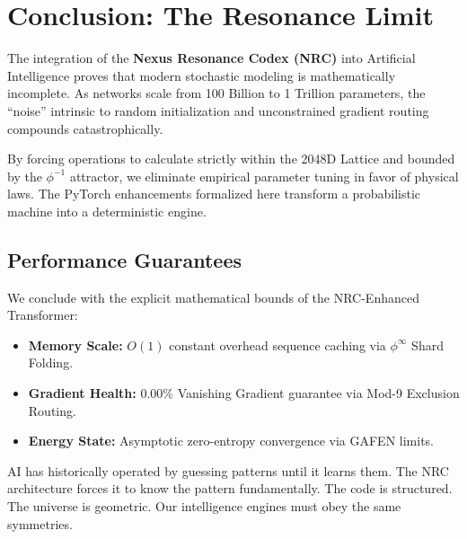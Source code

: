 \section{Conclusion: The Resonance Limit}

The integration of the \textbf{Nexus Resonance Codex (NRC)} into Artificial Intelligence proves that modern stochastic modeling is mathematically incomplete. As networks scale from 100 Billion to 1 Trillion parameters, the ``noise'' intrinsic to random initialization and unconstrained gradient routing compounds catastrophically.

By forcing operations to calculate strictly within the 2048D Lattice and bounded by the $\phi^{-1}$ attractor, we eliminate empirical parameter tuning in favor of physical laws. The PyTorch enhancements formalized here transform a probabilistic machine into a deterministic engine.

\subsection{Performance Guarantees}
We conclude with the explicit mathematical bounds of the NRC-Enhanced Transformer:
\begin{itemize}
	\item \textbf{Memory Scale:} $O(1)$ constant overhead sequence caching via $\phi^\infty$ Shard Folding.
	\item \textbf{Gradient Health:} 0.00\% Vanishing Gradient guarantee via Mod-9 Exclusion Routing.
	\item \textbf{Energy State:} Asymptotic zero-entropy convergence via GAFEN limits.
\end{itemize}

AI has historically operated by guessing patterns until it learns them. The NRC architecture forces it to know the pattern fundamentally. The code is structured. The universe is geometric. Our intelligence engines must obey the same symmetries.
